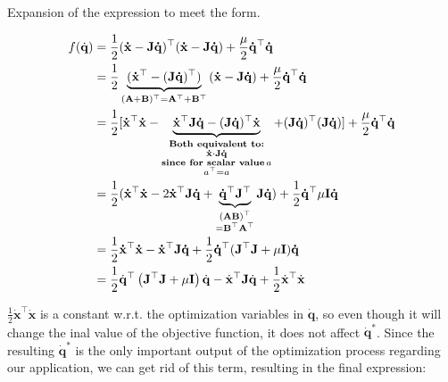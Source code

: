 Expansion of the expression to meet the form.

\begin{equation*}
    \begin{split}
    f(\dot{\mathbf{q}}) & = \frac{1}{2} \mathbf{(\dot{x}-J\dot{q})^{\top} (\dot{x}-J\dot{q})} + \frac{\mu}{2} \mathbf{\dot{q}^{\top} \dot{q}}
    \\ & = \frac{1}{2} \underbrace{ ( \mathbf{\dot{x}^{\top}-(J\dot{q})^{\top}} )}_\mathbf{ (A+B)^{\top} = A^{\top} + B^{\top} }  \mathbf{(\dot{x}-J\dot{q})}  + \frac{\mu}{2} \mathbf{\dot{q}^{\top} \dot{q}}
    \\ & = \frac{1}{2} \mathbf{[ \dot{x}^{\top} \dot{x} - \underbrace{\mathbf{\dot{x}^{\top} J\dot{q} - (J\dot{q})^{\top} \dot{x}} }_{\substack{\emph{Both equivalent to:} \\ \mathbf{\dot{x} \cdot J\dot{q}} \\ \emph{since for scalar value} \, a \\ a^{\top} = a }} + (J\dot{q})^{\top} (J\dot{q}) ]} + \frac{\mu}{2} \mathbf{\dot{q}^{\top} \dot{q}}
    \\ & = \frac{1}{2} \mathbf{( \dot{x}^{\top} \dot{x}} - 2 \mathbf{ \dot{x}^{\top} J\dot{q} + \underbrace{\mathbf{\dot{q}^{\top} J^{\top}}}_{\substack{\mathbf{(AB)^{\top}} \\ = \mathbf{B^{\top}A^{\top}} }} J \dot{q} )} + \frac{1}{2} \mathbf{\dot{q}^{\top} \mu I \dot{q}}
    \\ & = \frac{1}{2} \mathbf{ \dot{x}^{\top} \dot{x} -  \dot{x}^{\top} J\dot{q} } + \frac{1}{2} \mathbf{\dot{q}^{\top} (J^{\top}J + \mu I) \dot{q}}
    \\ & = \frac{1}{2}\dot{\mathbf{q}}^{\top}\left(\mathbf{J}^{\top} \mathbf{J}+\mu \mathbf{I}\right) \dot{\mathbf{q}}-\dot{\mathbf{x}}^{\top} \mathbf{J} \dot{\mathbf{q}}+\frac{1}{2} \dot{\mathbf{x}}^{\top} \dot{\mathbf{x}}
    \end{split}
\end{equation*}

$\frac{1}{2} \dot{\mathbf{x}}^{\top} \dot{\mathbf{x}}$ is a constant w.r.t. the optimization variables in $\mathbf{\dot{q}}$, so even though it will change the inal value of the objective function, it does not affect $\mathbf{\dot{q}^{*}}$. Since the resulting $\mathbf{\dot{q}^{*}}$ is the only important output of the optimization process regarding our application, we can get rid of this term, resulting in the final expression:

